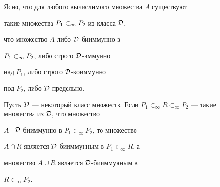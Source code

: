 Ясно, что для любого вычислимого множества $A$ существуют


такие множества ${P_1}\subset_\infty{P_2}$ из класса $\cal{D}$,


что множество $A$ либо $\cal{D}$-бииммунно в


${P_1}\subset_\infty{P_2}$, либо строго $\cal{D}$-иммунно


над $P_1$, либо строго $\cal{D}$-коиммунно


под $P_2$, либо $\cal{D}$-предельно.








\begin{prop}


Пусть $\cal{D}$ --- некоторый класс множеств. Если $P_1\subset_\infty


R\subset_\infty P_2$ --- такие множества из $\cal{D}$, что множество


$A$ \ $\cal{D}$-бииммунно в $P_1\subset_\infty P_2$, то множество


$A\cap R$ является $\cal{D}$-бииммунным в $P_1\subset_\infty R$, а


множество $A\cup R$ является $\cal{D}$-бииммунным в


$R\subset_\infty P_2$.


\end{prop}








